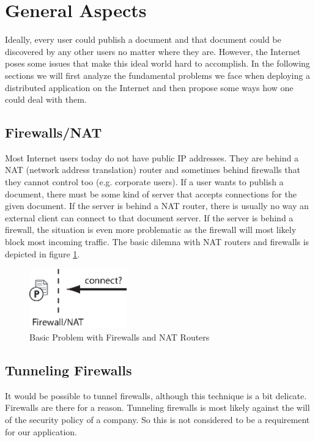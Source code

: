 \section{General Aspects}
Ideally, every user could publish a document and that document could be discovered by any other users no matter where they are. However, the Internet poses some issues that make this ideal world hard to accomplish. In the following sections we will first analyze the fundamental problems we face when deploying a distributed application on the Internet and then propose some ways how one could deal with them.

\subsection{Firewalls/NAT}
Most Internet users today do not have public IP addresses. They are behind a NAT (network address translation) router and sometimes behind firewalls that they cannot control too (e.g. corporate users). If a user wants to publish a document, there must be some kind of server that accepts connections for the given document. If the server is behind a NAT router, there is usually no way an external client can connect to that document server. If the server is behind a firewall, the situation is even more problematic as the firewall will most likely block most incoming traffic. The basic dilemna with NAT routers and firewalls is depicted in figure \ref{fig:firewall}.

\begin{figure}[H]
 \centering
 \includegraphics[width=4.2cm,height=2.6cm]{../../images/net_firewall.eps}
 \caption{Basic Problem with Firewalls and NAT Routers}
 \label{fig:firewall}
\end{figure}

\subsection{Tunneling Firewalls}
It would be possible to tunnel firewalls, although this technique is a bit delicate. Firewalls are there for a reason. Tunneling firewalls is most likely against the will of the security policy of a company. So this is not considered to be a requirement for our application.

